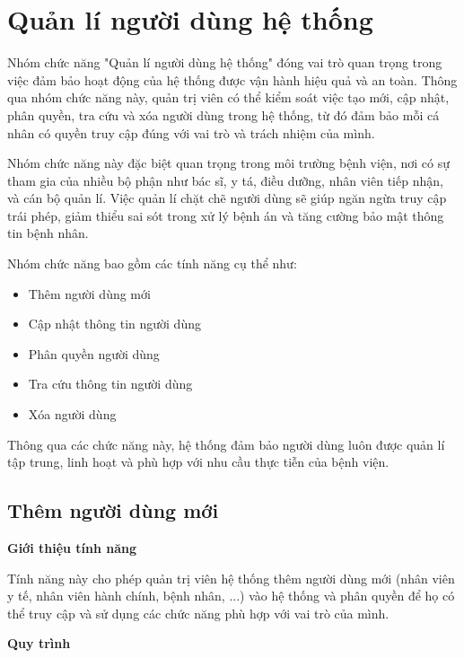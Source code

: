 \section{Quản lí người dùng hệ thống}

Nhóm chức năng "Quản lí người dùng hệ thống" đóng vai trò quan trọng trong việc đảm bảo hoạt động của hệ thống được vận hành hiệu quả và an toàn. Thông qua nhóm chức năng này, quản trị viên có thể kiểm soát việc tạo mới, cập nhật, phân quyền, tra cứu và xóa người dùng trong hệ thống, từ đó đảm bảo mỗi cá nhân có quyền truy cập đúng với vai trò và trách nhiệm của mình.

Nhóm chức năng này đặc biệt quan trọng trong môi trường bệnh viện, nơi có sự tham gia của nhiều bộ phận như bác sĩ, y tá, điều dưỡng, nhân viên tiếp nhận, và cán bộ quản lí. Việc quản lí chặt chẽ người dùng sẽ giúp ngăn ngừa truy cập trái phép, giảm thiểu sai sót trong xử lý bệnh án và tăng cường bảo mật thông tin bệnh nhân.

Nhóm chức năng bao gồm các tính năng cụ thể như:

\begin{itemize}
    \item Thêm người dùng mới
    \item Cập nhật thông tin người dùng 
    \item Phân quyền người dùng 
    \item Tra cứu thông tin người dùng 
    \item Xóa người dùng 
\end{itemize}

Thông qua các chức năng này, hệ thống đảm bảo người dùng luôn được quản lí tập trung, linh hoạt và phù hợp với nhu cầu thực tiễn của bệnh viện.

\subsection{Thêm người dùng mới} 

\noindent \textbf{Giới thiệu tính năng}

Tính năng này cho phép quản trị viên hệ thống thêm người dùng mới (nhân viên y tế, nhân viên hành chính, bệnh nhân, ...) vào hệ thống và phân quyền để họ có thể truy cập và sử dụng các chức năng phù hợp với vai trò của mình.

\noindent \textbf{Quy trình}

